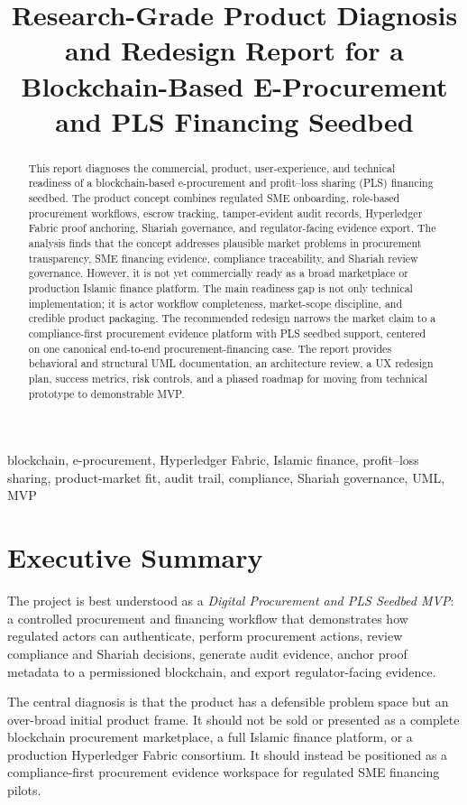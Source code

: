 \documentclass[conference]{IEEEtran}
\title{Research-Grade Product Diagnosis and Redesign Report for a Blockchain-Based E-Procurement and PLS Financing Seedbed}
\author{\IEEEauthorblockN{Prepared for the Blockchain-Based E-Procurement System Project}
\IEEEauthorblockA{Product, Architecture, UX, and Delivery Diagnosis\\
Generated as a research-grade decision document for MVP redesign and commercial readiness planning}}
\begin{document}
\maketitle

\begin{abstract}
This report diagnoses the commercial, product, user-experience, and technical readiness of a blockchain-based e-procurement and profit--loss sharing (PLS) financing seedbed. The product concept combines regulated SME onboarding, role-based procurement workflows, escrow tracking, tamper-evident audit records, Hyperledger Fabric proof anchoring, Shariah governance, and regulator-facing evidence export. The analysis finds that the concept addresses plausible market problems in procurement transparency, SME financing evidence, compliance traceability, and Shariah review governance. However, it is not yet commercially ready as a broad marketplace or production Islamic finance platform. The main readiness gap is not only technical implementation; it is actor workflow completeness, market-scope discipline, and credible product packaging. The recommended redesign narrows the market claim to a compliance-first procurement evidence platform with PLS seedbed support, centered on one canonical end-to-end procurement-financing case. The report provides behavioral and structural UML documentation, an architecture review, a UX redesign plan, success metrics, risk controls, and a phased roadmap for moving from technical prototype to demonstrable MVP.
\end{abstract}

\begin{IEEEkeywords}
blockchain, e-procurement, Hyperledger Fabric, Islamic finance, profit--loss sharing, product-market fit, audit trail, compliance, Shariah governance, UML, MVP
\end{IEEEkeywords}

\section{Executive Summary}

The project is best understood as a \textit{Digital Procurement and PLS Seedbed MVP}: a controlled procurement and financing workflow that demonstrates how regulated actors can authenticate, perform procurement actions, review compliance and Shariah decisions, generate audit evidence, anchor proof metadata to a permissioned blockchain, and export regulator-facing evidence.

The central diagnosis is that the product has a defensible problem space but an over-broad initial product frame. It should not be sold or presented as a complete blockchain procurement marketplace, a full Islamic finance platform, or a production Hyperledger Fabric consortium. It should instead be positioned as a compliance-first procurement evidence workspace for regulated SME financing pilots.
\end{document}
